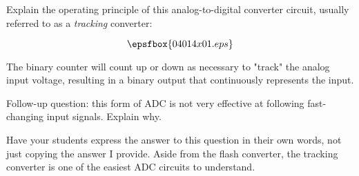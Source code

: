 

Explain the operating principle of this analog-to-digital converter circuit, usually referred to as a {\it tracking} converter:

$$\epsfbox{04014x01.eps}$$







The binary counter will count up or down as necessary to "track" the analog input voltage, resulting in a binary output that continuously represents the input.

\vskip 10pt

Follow-up question: this form of ADC is not very effective at following fast-changing input signals.  Explain why.







Have your students express the answer to this question in their own words, not just copying the answer I provide.  Aside from the flash converter, the tracking converter is one of the easiest ADC circuits to understand. 




